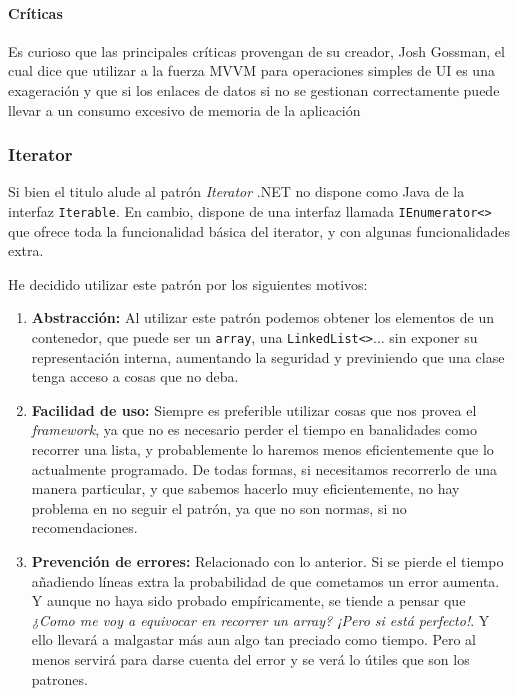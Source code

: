 \paragraph{Cr\'{i}ticas}
Es curioso que las principales cr\'{i}ticas provengan de su creador, Josh Gossman, el cual dice que utilizar a la fuerza MVVM para operaciones simples
de UI es una exageraci\'{o}n y que si los enlaces de datos si no se gestionan correctamente puede llevar a un consumo excesivo de 
memoria de la aplicaci\'{o}n \cite{MVVM:Criticism}

\subsubsection{Iterator}
Si bien el titulo alude al patr\'{o}n \emph{Iterator} .NET no dispone como Java de la interfaz \texttt{Iterable}.
En cambio, dispone de una interfaz llamada \texttt{IEnumerator<>} que ofrece toda la funcionalidad b\'{a}sica del iterator,
y con algunas funcionalidades extra.

He decidido utilizar este patr\'{o}n por los siguientes motivos:
\begin{enumerate}
    \item \textbf{Abstracci\'{o}n:}
    Al utilizar este patr\'{o}n podemos obtener los elementos de un contenedor, que puede ser un \texttt{array}, una \texttt{LinkedList<>}... sin
    exponer su representaci\'{o}n interna, aumentando la seguridad y previniendo que una clase tenga acceso a cosas que no deba.
    
    \item \textbf{Facilidad de uso:}
    Siempre es preferible utilizar cosas que nos provea el \emph{framework}, ya que no es necesario perder el tiempo en banalidades como 
    recorrer una lista, y probablemente lo haremos menos eficientemente que lo actualmente programado. De todas formas, si necesitamos
    recorrerlo de una manera particular, y que sabemos hacerlo muy eficientemente, no hay problema en no seguir el patr\'{o}n, ya que no son
    normas, si no recomendaciones.
    
    \item \textbf{Prevenci\'{o}n de errores:}
    Relacionado con lo anterior. Si se pierde el tiempo a\~{n}adiendo l\'{i}neas extra la probabilidad de que cometamos un error 
    aumenta. Y aunque no haya sido probado emp\'{i}ricamente, se tiende a pensar que \emph{¿Como me voy a equivocar en recorrer un array? ¡Pero si est\'{a} perfecto!}. 
    Y ello llevar\'{a} a malgastar m\'{a}s aun algo tan preciado como tiempo. Pero al menos servir\'a para darse cuenta del error y 
    se ver\'a lo \'{u}tiles que son los patrones.
\end{enumerate}

